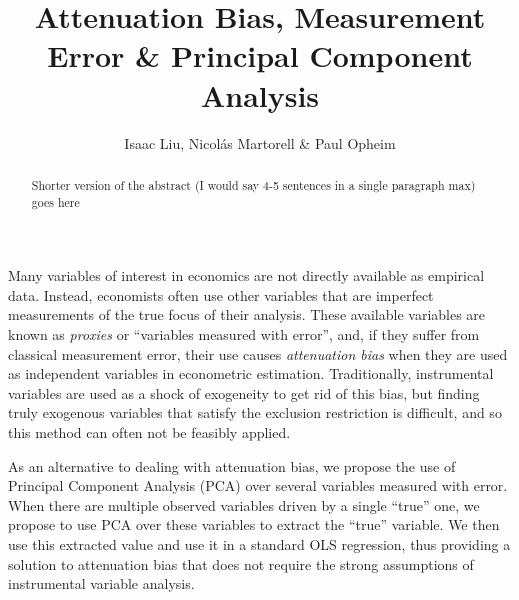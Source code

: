 \documentclass[12pt]{article}
\begin{document}
    \thispagestyle{firststyle}

    \author{Isaac Liu, Nicol\'as Martorell \& Paul Opheim}
    \title{Attenuation Bias, Measurement Error \& Principal Component Analysis} 
    \maketitle



    \begin{abstract}

        Shorter version of the abstract (I would say 4-5 sentences in a single paragraph max) goes here
        
    \end{abstract}

    \newpage \clearpage


        Many variables of interest in economics are not directly available as empirical data. Instead, economists often use other variables that are imperfect measurements of the true focus of their analysis. These available variables are known as \textit{proxies} or ``variables measured with error'', and, if they suffer from classical measurement error, their use causes \textit{attenuation bias} when they are used as independent variables in econometric estimation. Traditionally, instrumental variables are used as a shock of exogeneity to get rid of this bias, but finding truly exogenous variables that satisfy the exclusion restriction is difficult, and so this method can often not be feasibly applied.

        As an alternative to dealing with attenuation bias, we propose the use of Principal Component Analysis (PCA) over several variables measured with error. When there are multiple observed variables driven by a single ``true'' one, we propose to use PCA over these variables to extract the ``true'' variable. We then use this extracted value and use it in a standard OLS regression, thus providing a solution to attenuation bias that does not require the strong assumptions of instrumental variable analysis.
\end{document}
